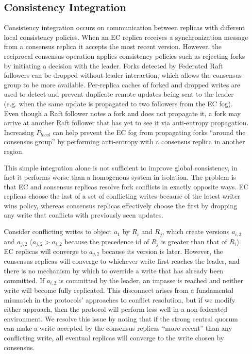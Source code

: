 \subsection{Consistency Integration}
\label{ch04_consistency_integration}

Consistency integration occurs on communication between replicas with different local consistency policies.
When an EC replica receives a synchronization message from a consensus replica it accepts the most recent version.
However, the reciprocal consensus operation applies consistency policies such as rejecting forks by initiating a decision with the leader.
Forks detected by Federated Raft followers can be dropped without leader interaction, which allows the consensus group to be more
available.
Per-replica caches of forked and dropped writes are used to detect and prevent duplicate remote updates being sent to the leader (e.g. when the same update is propagated to two followers from the EC fog).
Even though a Raft follower notes a fork and does not propagate it, a fork may arrive at another Raft follower that has yet to see it via anti-entropy propagation.
Increasing $P_{local}$ can help prevent the EC fog from propagating forks ``around the consensus group'' by performing anti-entropy with a consensus replica in another region.

This simple integration alone is not sufficient to improve global consistency, in fact it performs worse than a homogenous system in isolation.
The problem is that EC and consensus replicas resolve fork conflicts in exactly opposite ways.
EC replicas choose the last of a set of conflicting writes because of the latest writer wins policy, whereas consensus replicas effectively choose the first by dropping any write that conflicts with previously seen updates.

Consider conflicting writes to object $a_1$ by $R_i$ and $R_j$, which create versions $a_{i,2}$ and $a_{j,2}$ ($a_{j,2} > a_{i,2}$ because the precedence id of $R_j$ is greater than that of $R_i$).
EC replicas will converge to $a_{j,2}$ because its version is later.
However, the consensus replicas will converge to whichever write first reaches the leader, and there is no mechanism by which to override a write that has already been committed.
If $a_{i,2}$ is committed by the leader, an impasse is reached and neither write will become fully replicated.
This disconnect arises from a fundamental mismatch in the protocols' approaches to conflict resolution, but if we modify either approach, then the protocol will perform less well in a non-federated environment.
We resolve this issue by noting that if the strong central quorum can make a write accepted by the consensus replicas ``more recent'' than any conflicting write, all eventual replicas will converge to the write chosen by consensus.

